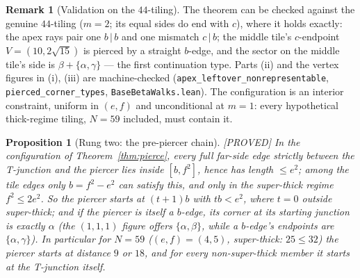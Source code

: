 \documentclass[11pt,reqno]{amsart}
\theoremstyle{plain}
\newtheorem{proposition}[theorem]{Proposition}
\theoremstyle{definition}
\newtheorem{remark}[theorem]{Remark}
\newcommand{\lab}[1]{\hfill\textnormal{\footnotesize\textsc{[#1]}}}
\begin{document}
\begin{remark}[Validation on the $44$-tiling]\label{rem:pierce}
The theorem can be checked against the genuine $44$-tiling ($m=2$; its equal sides do end with $c$),
where it holds exactly: the apex rays pair one $b\,|\,b$ and one mismatch $c\,|\,b$; the middle
tile's $c$-endpoint $V=(10,2\sqrt{15})$ is pierced by a straight $b$-edge, and the sector on the
middle tile's side is $\beta+\{\alpha,\gamma\}$ --- the first continuation type. Parts (ii) and the
vertex figures in (i), (iii) are machine-checked (\texttt{apex\_leftover\_nonrepresentable},
\texttt{pierced\_corner\_types}, \texttt{BaseBetaWalks.lean}). The configuration is an interior
constraint, uniform in $(e,f)$ and unconditional at $m=1$: every hypothetical thick-regime tiling,
$N=59$ included, must contain it.
\end{remark}

\begin{proposition}[Rung two: the pre-piercer chain]\label{prop:rung2}\lab{PROVED}
In the configuration of Theorem~\ref{thm:pierce}, every full far-side edge strictly between the
T-junction and the piercer lies inside $[b,f^2]$, hence has length $\le e^2$; among the tile edges
only $b=f^2-e^2$ can satisfy this, and only in the \emph{super-thick} regime $f^2\le 2e^2$. So the
piercer starts at $(t+1)b$ with $tb<e^2$, where $t=0$ outside super-thick; and if the piercer is
itself a $b$-edge, its corner at its starting junction is exactly $\alpha$ (the $(1,1,1)$ figure
offers $\{\alpha,\beta\}$, while a $b$-edge's endpoints are $\{\alpha,\gamma\}$). In particular for
$N=59$ ($(e,f)=(4,5)$, super-thick: $25\le32$) the piercer starts at distance $9$ or $18$, and for
every non-super-thick member it starts at the T-junction itself.
\end{proposition}
\end{document}
